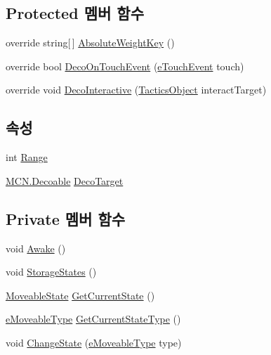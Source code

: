 \subsection*{Protected 멤버 함수}
\begin{DoxyCompactItemize}
\item 
override string\mbox{[}$\,$\mbox{]} \hyperlink{class_move_decorator_a46aea0fa3f7be5fd9b6ab35801166af4}{Absolute\+Weight\+Key} ()
\item 
override bool \hyperlink{class_move_decorator_acd118d50499d78a03d810aff30b7b50e}{Deco\+On\+Touch\+Event} (\hyperlink{_touch_manager_8cs_ae33e321a424fe84ba8b2fdb81ad40a68}{e\+Touch\+Event} touch)
\item 
override void \hyperlink{class_move_decorator_a5d25ac6e9eacf33c5ab0423059ebcadc}{Deco\+Interactive} (\hyperlink{class_tactics_object}{Tactics\+Object} interact\+Target)
\end{DoxyCompactItemize}
\subsection*{속성}
\begin{DoxyCompactItemize}
\item 
int \hyperlink{class_move_decorator_aabb7a267f00c0ce5ad2d26e9daaa4b96}{Range}
\item 
\hyperlink{class_m_c_n_1_1_decoable}{M\+C\+N.\+Decoable} \hyperlink{class_m_c_n_1_1_decorator_a1306a0a8b814650cd5970a1ffc7ba2fe}{Deco\+Target}
\end{DoxyCompactItemize}
\subsection*{Private 멤버 함수}
\begin{DoxyCompactItemize}
\item 
void \hyperlink{class_move_decorator_a18f4c0f61c6b2581ebf291f976cb2756}{Awake} ()
\item 
void \hyperlink{class_move_decorator_a1a8b4d4a8a56735f3b33ea0912526cde}{Storage\+States} ()
\item 
\hyperlink{class_move_decorator_1_1_moveable_state}{Moveable\+State} \hyperlink{class_move_decorator_ad6f988cbbd3dce9e33bb0c08609f012f}{Get\+Current\+State} ()
\item 
\hyperlink{_move_decorator_8cs_a90215797ba850e199f3ef63d7c56f132}{e\+Moveable\+Type} \hyperlink{class_move_decorator_a4da4b651ccf38b250af93eaeeddd1912}{Get\+Current\+State\+Type} ()
\item 
void \hyperlink{class_move_decorator_ac7ad3c87a970caf3ddd8ea0b74276d30}{Change\+State} (\hyperlink{_move_decorator_8cs_a90215797ba850e199f3ef63d7c56f132}{e\+Moveable\+Type} type)
\end{DoxyCompactItemize}
